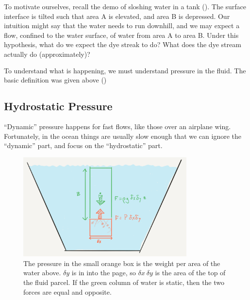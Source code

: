 To motivate ourselves, recall the demo of sloshing water in a tank ().  The surface interface is tilted such that area A is elevated, and area B is depressed.  Our intuition might say that the water needs to run downhill, and we may expect a flow, confined to the water surface, of water from area A to area B. Under this hypothesis, what do we expect the dye streak to do?  What does the dye stream actually do (approximately)?

To understand what is happening, we must understand pressure in the fluid.  The basic definition was given above ()


\subsection{Hydrostatic Pressure}

``Dynamic'' pressure happens for fast flows, like those over an
airplane wing.  Fortunately, in the ocean things are usually slow
enough that we can ignore the ``dynamic'' part, and focus on the
``hydrostatic'' part.

\begin{figure}[htbp]
\includegraphics[width=3.5in]{figs/OneDens.png}
\caption{The pressure in the small orange box is  the weight per area of the water above.  $\delta y $ is in into the page, so $\delta x\ \delta y$ is the area of the top of the fluid parcel.  If the green column of water is static, then the two forces are equal and opposite.  }
\label{fig:OneDens}
\end{figure}


